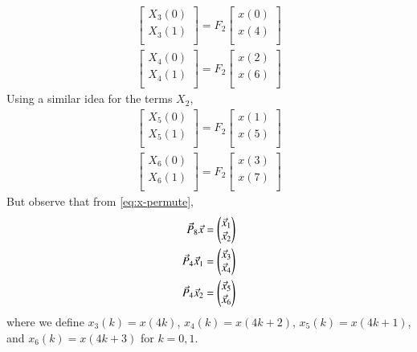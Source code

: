 \documentclass[journal,12pt,twocolumn]{IEEEtran}
\renewcommand\thesection{\arabic{section}}
\begin{document}
\begin{enumerate}[label=\arabic*.,ref=\thesection.\theenumi]
	\begin{align}
		\begin{bmatrix}
			X_{3}(0) \\ 
			X_{3}(1)\\ 
		\end{bmatrix}
		= F_{2}
		\begin{bmatrix}
			x(0) \\ 
			x(4) \\ 
		\end{bmatrix} \\
		\begin{bmatrix}
			X_{4}(0) \\ 
			X_{4}(1)\\ 
		\end{bmatrix}
		= F_{2}
		\begin{bmatrix}
			x(2) \\ 
			x(6) \\ 
		\end{bmatrix}
	\end{align}
	Using a similar idea for the terms $X_2$, 
	\begin{align}
		\begin{bmatrix}
			X_{5}(0) \\ 
			X_{5}(1)\\ 
		\end{bmatrix}
		= F_{2}
		\begin{bmatrix}
			x(1) \\ 
			x(5) \\ 
		\end{bmatrix} \\
		\begin{bmatrix}
			X_{6}(0) \\ 
			X_{6}(1)\\ 
		\end{bmatrix}
		= F_{2}
		\begin{bmatrix}
			x(3) \\ 
			x(7) \\ 
		\end{bmatrix}
	\end{align}
	But observe that from \eqref{eq:x-permute},
	\begin{align}
		\vec{P}_8\vec{x} &= \begin{pmatrix}\vec{x}_1\\\vec{x}_2\end{pmatrix} \\
		\vec{P}_4\vec{x}_1 &= \begin{pmatrix}\vec{x}_3\\\vec{x}_4\end{pmatrix} \\ 
		\vec{P}_4\vec{x}_2 &= \begin{pmatrix}\vec{x}_5\\\vec{x}_6\end{pmatrix}
	\end{align}
	where we define $x_3(k) = x(4k)$, $x_4(k) = x(4k + 2)$, $x_5(k) = x(4k + 1)$, and $x_6(k) = x(4k + 3)$ for $k = 0, 1$.
	

\end{enumerate}
\end{document}
